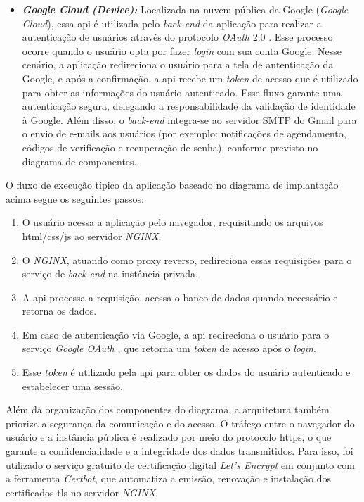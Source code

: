 \begin{itemize}
  \item \textbf{\textit{Google Cloud (Device):}} Localizada na nuvem pública da Google (\textit{Google Cloud}), essa \gls{api} é utilizada pelo \emph{back-end} da aplicação para realizar a autenticação de usuários através do protocolo \emph{OAuth} 2.0 \cite{GoogleOAuth}. Esse processo ocorre quando o usuário opta por fazer \emph{login} com sua conta Google. Nesse cenário, a aplicação redireciona o usuário para a tela de autenticação da Google, e após a confirmação, a \gls{api} recebe um \textit{token} de acesso que é utilizado para obter as informações do usuário autenticado. Esse fluxo garante uma autenticação segura, delegando a responsabilidade da validação de identidade à Google. Além disso, o \emph{back-end} integra-se ao servidor SMTP do Gmail para o envio de e-mails aos usuários (por exemplo: notificações de agendamento, códigos de verificação e recuperação de senha), conforme previsto no diagrama de componentes.
\end{itemize}

O fluxo de execução típico da aplicação baseado no diagrama de implantação acima segue os seguintes passos:
\begin{enumerate}
  \item O usuário acessa a aplicação pelo navegador, requisitando os arquivos \gls{html}\slash\gls{css}\slash\gls{js} ao servidor \emph{NGINX}.
  \item O \emph{NGINX}, atuando como proxy reverso, redireciona essas requisições para o serviço de \emph{back-end} na instância privada.
  \item A \gls{api} processa a requisição, acessa o banco de dados quando necessário e retorna os dados.
  \item Em caso de autenticação via Google, a \gls{api} redireciona o usuário para o serviço \emph{Google OAuth} \cite{GoogleOAuth}, que retorna um \emph{token} de acesso após o \emph{login}.
  \item Esse \emph{token} é utilizado pela \gls{api} para obter os dados do usuário autenticado e estabelecer uma sessão.
\end{enumerate}

Além da organização dos componentes do diagrama, a arquitetura também prioriza a segurança da comunicação e do acesso. O tráfego entre o navegador do usuário e a instância pública é realizado por meio do protocolo \gls{https}, o que garante a confidencialidade e a integridade dos dados transmitidos. Para isso, foi utilizado o serviço gratuito de certificação digital \emph{Let's Encrypt} em conjunto com a ferramenta \emph{Certbot}, que automatiza a emissão, renovação e instalação dos certificados \gls{tls} no servidor \emph{NGINX}.

